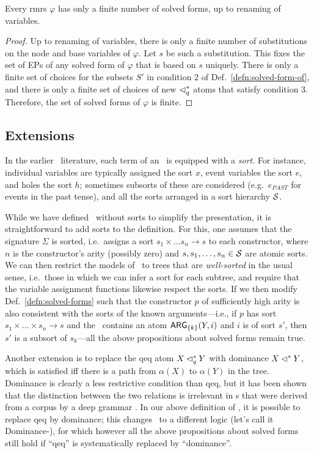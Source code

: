 \begin{prop}
  Every {\sc rmrs} $\varphi$ has only a finite number of solved forms, up to
  renaming of variables.
\end{prop}
\begin{proof}
  Up to renaming of variables, there is only a finite number of
  substitutions on the node and base variables of $\varphi$.  Let $s$
  be such a substitution.  This fixes the set of EPs of any solved
  form of $\varphi$ that is based on $s$ uniquely.  There is only a
  finite set of choices for the subsets $S'$ in condition 2 of
  Def.~\ref{defn:solved-form-of}, and there is only a finite set of
  choices of new $\lhd^*_q$ atoms that satisfy condition 3.  Therefore,
  the set of solved forms of $\varphi$ is finite.
\end{proof}




\subsection{Extensions}

In the earlier \rmrs\ literature, each term of an \rmrs\ is equipped
with a \emph{sort}.  For instance, individual variables are typically
assigned the sort $x$, event variables the sort $e$, and holes the
sort $h$; sometimes subsorts of these are considered (e.g.\ $e_{PAST}$
for events in the past tense), and all the sorts arranged in a sort
hierarchy ${\cal S}$.

While we have defined \rmrs\ without sorts to simplify the
presentation, it is straightforward to add sorts to the definition.
For this, one assumes that the signature $\Sigma$ is sorted, i.e.\
assigns a sort $s_1\times\ldots s_n\rightarrow s$ to each constructor,
where $n$ is the constructor's arity (possibly zero) and
$s,s_1,\ldots,s_n\in {\cal S}$ are atomic sorts.  We can then
restrict the models of \rmrs\ to trees that are \emph{well-sorted} in
the usual sense, i.e.\ those in which we can infer a sort for each
subtree, and require that the variable assignment functions likewise
respect the sorts.  If we then modify Def.~\ref{defn:solved-forms}
such that the constructor $p$ of sufficiently high arity is also
consistent with the sorts of the known arguments---i.e., if $p$ has
sort $s_1 \times \ldots \times s_n \rightarrow s$ and the \rmrs\
contains an atom $\mathsf{ARG}_{\{k\}}(Y,i)$ and $i$ is of sort $s'$, then
$s'$ is a subsort of $s_k$---all the above propositions about solved
forms remain true.

Another extension is to replace
the qeq atom $X \lhd^*_q Y$ with dominance $X \lhd^* Y$, 
which is satisfied iff there is a path
from $\alpha(X)$ to $\alpha(Y)$ in the tree.  Dominance is clearly a
less restrictive condition than qeq, but it has been shown that the
distinction between the two relations is irrelevant in \mrs s that were
derived from a corpus by a deep grammar \cite{FucKolNieTha04}.  In our
above definition of \rmrs, it is possible to replace qeq by dominance;
this changes \rmrs\ to a different logic (let's call it
Dominance-\rmrs), for which however all the above propositions about
solved forms still hold if ``qeq'' is systematically replaced by
``dominance''. 


